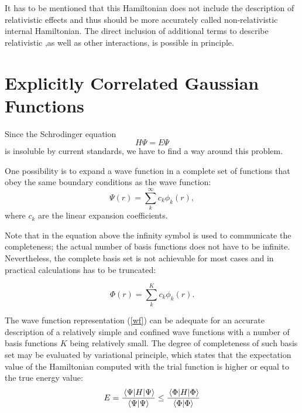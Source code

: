 It has to be mentioned that this Hamiltonian does not include the description 
of relativistic effects and thus should be more accurately called non-relativistic
internal Hamiltonian. The direct inclusion of additional terms to describe
relativistic ,as well as other interactions, is possible in principle.


\section{Explicitly Correlated Gaussian Functions}

Since the Schrodinger equation 
\begin{equation}
H \Psi = E \Psi
\end{equation}
is insoluble by current standards, we have to find a way
around this problem.

One possibility is to expand a wave function in a complete 
set of functions that obey the same boundary conditions
as the wave function:
\begin{equation}
\Psi (r) = \sum_k^{\infty} c_k \phi_k(r),
\end{equation}
where $c_k$ are the linear expansion coefficients.

Note that in the equation above the infinity symbol is used to 
communicate the completeness; the actual number of basis functions
does not have to be infinite. Nevertheless, the complete basis
set is not achievable for most cases and in practical calculations 
has to be truncated:

\begin{equation}
\Phi (r) = \sum_k^{K} c_k \phi_k(r).
\label{wf}
\end{equation}

The wave function representation (\ref{wf}) can be adequate for
an accurate description of a relatively simple and confined 
wave functions with a number of basis functions $K$ being
relatively small. The degree of completeness of such basis set 
may be evaluated by variational principle, which states that 
the expectation value of the Hamiltonian computed with the 
trial function is higher or equal to the true energy value:
\begin{equation}
E = \frac{\expval{H}{\Psi}}{\bra{\Psi}\ket{\Psi}} \leq 
\frac{\expval{H}{\Phi}}{\bra{\Phi}\ket{\Phi}}
\label{var_principle}
\end{equation}


